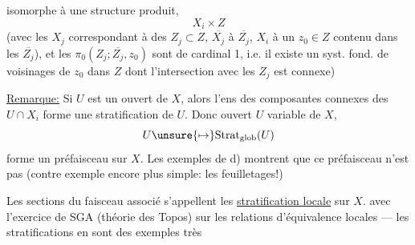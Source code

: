 
isomorphe à une structure produit,
\[
X_i\times Z
\]
(avec les $X_j$ correspondant à des $Z_j\subset Z$, $\overline{X_j}$ à $\overline{Z_j}$, $X_i$ à un $z_0\in Z$ contenu dans les $\overline{Z_j}$), et les $\pi_0(Z_j;\overline{Z_j},z_0)$ sont de cardinal 1, i.e. il existe  un syst. fond. de voisinages de $z_0$ dans $Z$ dont l'intersection avec les $Z_j$ est connexe)


\uline{Remarque:} Si $U$ est un ouvert de $X$, alors l'ens des composantes connexes des $U\cap X_i$ forme  une stratification  de $U$. Donc   ouvert $U$ variable de $X$,
\[
U\unsure{\mapsto}\mathrm{Strat}_{\mathrm{glob}}(U)
\]
forme un préfaisceau sur $X$. Les exemples de d) montrent que ce préfaisceau n'est pas   (contre exemple encore plus simple: les feuilletages!)


Les sections du faisceau associé s'appellent les  \uline{stratification locale} sur $X$.  avec l'exercice de SGA (théorie des Topos) sur les relations d'équivalence locales --- les stratifications en sont des exemples très

